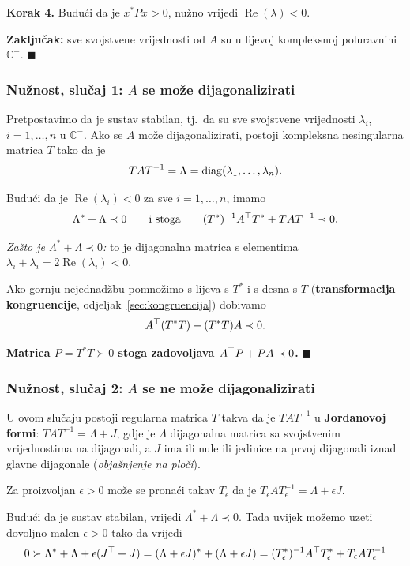 \textbf{Korak 4.} Budući da je $x^{*}Px > 0$, nužno vrijedi
$\operatorname{Re}(\lambda) < 0$.

\textbf{Zaključak:} sve svojstvene vrijednosti od $A$ su u lijevoj kompleksnoj
poluravnini $\mathbb{C}^-$. $\blacksquare$

\subsubsection*{Nužnost, slučaj 1: $A$ se može dijagonalizirati}

Pretpostavimo da je sustav stabilan, tj.\ da su sve svojstvene vrijednosti
$\lambda_i$, $i = 1,\dots,n$ u $\mathbb{C}^-$. Ako se $A$ može
dijagonalizirati, postoji kompleksna nesingularna matrica $T$ tako da je
\[
TAT^{-1} = \Lambda = \operatorname{diag}(\lambda_1,\dots,\lambda_n).
\]

Budući da je $\operatorname{Re}(\lambda_i) < 0$ za sve $i = 1,\dots,n$, imamo
\[
\Lambda^{*} + \Lambda \prec 0
\qquad\text{i stoga}\qquad
(T^{*})^{-1}A^{\top} T^{*} + TAT^{-1} \prec 0.
\]

\emph{Zašto je $\Lambda^{*} + \Lambda \prec 0$:} to je dijagonalna matrica s
elementima $\bar\lambda_i + \lambda_i = 2\operatorname{Re}(\lambda_i) < 0$.
\checkmark

Ako gornju nejednadžbu pomnožimo s lijeva s $T^{*}$ i s desna s $T$
(\textbf{transformacija kongruencije}, odjeljak~\ref{sec:kongruencija})
dobivamo
\[
A^{\top}(T^{*}T) + (T^{*}T)A \prec 0.
\]

\textbf{Matrica $P = T^{*}T \succ 0$ stoga zadovoljava $A^{\top} P + PA \prec 0$.}
$\blacksquare$

\subsubsection*{Nužnost, slučaj 2: $A$ se ne može dijagonalizirati}

U ovom slučaju postoji regularna matrica $T$ takva da je $TAT^{-1}$ u
\textbf{Jordanovoj formi}: $TAT^{-1} = \Lambda + J$, gdje je $\Lambda$
dijagonalna matrica sa svojstvenim vrijednostima na dijagonali, a $J$ ima ili
nule ili jedinice na prvoj dijagonali iznad glavne dijagonale
(\emph{objašnjenje na ploči}).

Za proizvoljan $\epsilon > 0$ može se pronaći takav $T_\epsilon$ da je
$T_\epsilon AT_\epsilon^{-1} = \Lambda + \epsilon J$.

Budući da je sustav stabilan, vrijedi $\Lambda^{*} + \Lambda \prec 0$. Tada
uvijek možemo uzeti dovoljno malen $\epsilon > 0$ tako da vrijedi
\[
0 \succ \Lambda^{*} + \Lambda + \epsilon(J^{\top} + J)
= (\Lambda + \epsilon J)^{*} + (\Lambda + \epsilon J)
= (T_\epsilon^{*})^{-1}A^{\top} T_\epsilon^{*} + T_\epsilon AT_\epsilon^{-1}
\]

